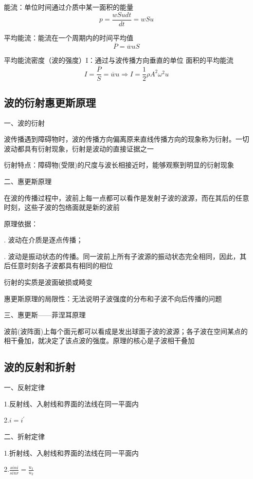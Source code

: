 \documentclass[UTF8]{article}
\begin{document}
    能流：单位时间通过介质中某一面积的能量
    \[p = \frac{wSudt}{dt} = wSu\]

    平均能流：能流在一个周期内的时间平均值
    \[\overline{P} = \overline{w}uS\]

    平均能流密度（波的强度）I：通过与波传播方向垂直的单位
    面积的平均能流
    \[I = \frac{\overline{P}}{S} = \overline{w}u\Rightarrow I = \frac{1}{2}\rho A^2\omega^2u\]

\subsection{波的衍射\;\;惠更斯原理}

    一、波的衍射

    波传播遇到障碍物时，波的传播方向偏离原来直线传播方向的现象称为衍射。一切波动都具有衍射现象，衍射是波动的直接证据之一

    衍射特点：障碍物(受限)的尺度与波长相接近时，能够观察到明显的衍射现象

    二、惠更斯原理

    在波的传播过程中，波前上每一点都可以看作是发射子波的波源，而在其后的任意时刻，这些子波的包络面就是新的波前

    原理依据： 
    
    \;. 波动在介质是逐点传播；

    \;. 波动是振动状态的传播。同一波前上所有子波源的振动状态完全相同，因此，其后任意时刻各子波都具有相同的相位  

    衍射的实质是波面破损或畸变

    惠更斯原理的局限性：无法说明子波强度的分布和子波不向后传播的问题

    三、惠更斯——菲涅耳原理

    波前(波阵面)上每个面元都可以看成是发出球面子波的波源；各子波在空间某点的相干叠加，就决定了该点波的强度。原理的核心是子波相干叠加

\subsection{波的反射和折射}

    一、反射定律

    1.反射线、入射线和界面的法线在同一平面内

    2.$i = i^{'}$

    二、折射定律

    1.折射线、入射线和界面的法线在同一平面内

    2.$\frac{sin i}{sin r} = \frac{u_1}{u_2}$
\end{document}
